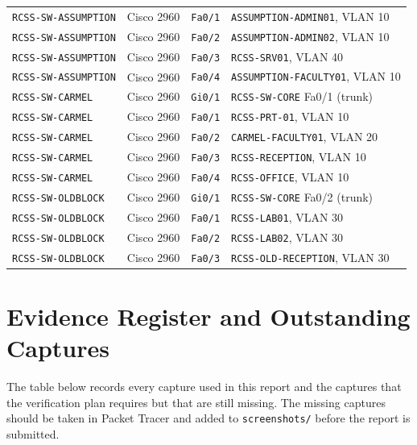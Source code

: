 \documentclass[11pt,a4paper]{article}
\begin{document}
\begin{longtable}{@{}L{0.24\textwidth} L{0.15\textwidth} L{0.22\textwidth} L{0.29\textwidth}@{}}
\texttt{RCSS-SW-ASSUMPTION} & Cisco 2960    & \texttt{Fa0/1}    & \texttt{ASSUMPTION-ADMIN01}, VLAN 10 \\
\texttt{RCSS-SW-ASSUMPTION} & Cisco 2960    & \texttt{Fa0/2}    & \texttt{ASSUMPTION-ADMIN02}, VLAN 10 \\
\texttt{RCSS-SW-ASSUMPTION} & Cisco 2960    & \texttt{Fa0/3}    & \texttt{RCSS-SRV01}, VLAN 40 \\
\texttt{RCSS-SW-ASSUMPTION} & Cisco 2960    & \texttt{Fa0/4}    & \texttt{ASSUMPTION-FACULTY01}, VLAN 10 \\
\texttt{RCSS-SW-CARMEL}    & Cisco 2960    & \texttt{Gi0/1}    & \texttt{RCSS-SW-CORE} Fa0/1 (trunk) \\
\texttt{RCSS-SW-CARMEL}    & Cisco 2960    & \texttt{Fa0/1}    & \texttt{RCSS-PRT-01}, VLAN 10 \\
\texttt{RCSS-SW-CARMEL}    & Cisco 2960    & \texttt{Fa0/2}    & \texttt{CARMEL-FACULTY01}, VLAN 20 \\
\texttt{RCSS-SW-CARMEL}    & Cisco 2960    & \texttt{Fa0/3}    & \texttt{RCSS-RECEPTION}, VLAN 10 \\
\texttt{RCSS-SW-CARMEL}    & Cisco 2960    & \texttt{Fa0/4}    & \texttt{RCSS-OFFICE}, VLAN 10 \\
\texttt{RCSS-SW-OLDBLOCK}  & Cisco 2960    & \texttt{Gi0/1}    & \texttt{RCSS-SW-CORE} Fa0/2 (trunk) \\
\texttt{RCSS-SW-OLDBLOCK}  & Cisco 2960    & \texttt{Fa0/1}    & \texttt{RCSS-LAB01}, VLAN 30 \\
\texttt{RCSS-SW-OLDBLOCK}  & Cisco 2960    & \texttt{Fa0/2}    & \texttt{RCSS-LAB02}, VLAN 30 \\
\texttt{RCSS-SW-OLDBLOCK}  & Cisco 2960    & \texttt{Fa0/3}    & \texttt{RCSS-OLD-RECEPTION}, VLAN 30 \\
\bottomrule
\end{longtable}

\section{Evidence Register and Outstanding Captures}
\label{app:evidence}

\noindent
The table below records every capture used in this report and the captures that the
verification plan requires but that are still missing. The missing captures should be
taken in Packet Tracer and added to \texttt{screenshots/} before the report is
submitted.
\end{document}
